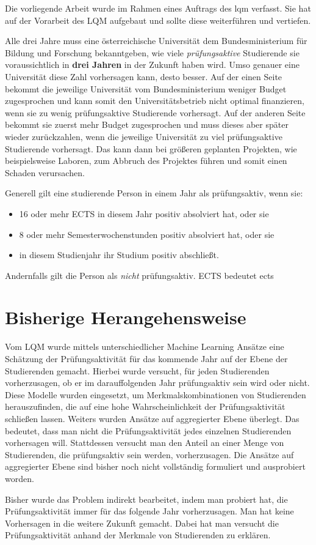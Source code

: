 

Die vorliegende Arbeit wurde im Rahmen eines Auftrags des \gls{lqm} verfasst. Sie hat auf der Vorarbeit des LQM aufgebaut und sollte diese weiterf\"uhren
und vertiefen.

Alle drei Jahre muss eine \"osterreichische Universität dem Bundesministerium f\"ur Bildung und Forschung
bekanntgeben, wie viele \textit{pr\"ufungsaktive} Studierende sie voraussichtlich in \textbf{drei Jahren}
in der Zukunft haben wird. Umso genauer eine Universität diese Zahl vorhersagen kann, desto besser.
Auf der einen Seite bekommt die jeweilige Universität vom Bundesministerium weniger Budget zugesprochen und kann somit 
den Universitätsbetrieb nicht optimal finanzieren, wenn sie zu 
wenig prüfungsaktive Studierende vorhersagt.
Auf der anderen Seite
bekommt sie zuerst mehr Budget zugesprochen und muss dieses aber sp\"ater wieder zur\"uckzahlen,
wenn die jeweilige Universität zu viel pr\"ufungsaktive Studierende vorhersagt. 
Das kann dann bei gr\"o{\ss}eren geplanten Projekten, wie beispielsweise Laboren,
zum Abbruch des Projektes f\"uhren und somit einen Schaden verursachen.

Generell gilt eine studierende Person in einem Jahr als pr\"ufungsaktiv, wenn sie:

\begin{itemize}
    \item 16 oder mehr ECTS in diesem Jahr positiv absolviert hat, oder sie
    \item 8 oder mehr Semesterwochenstunden positiv absolviert hat, oder sie
    \item in diesem Studienjahr ihr Studium positiv abschlie{\ss}t.
\end{itemize}
Andernfalls gilt die Person als \textit{nicht} pr\"ufungsaktiv.
ECTS bedeutet \gls{ects}


\section{Bisherige Herangehensweise}

Vom LQM wurde mittels unterschiedlicher Machine Learning Ans\"atze eine Sch\"atzung der Pr\"ufungsaktivit\"at
f\"ur das kommende Jahr auf der Ebene der Studierenden gemacht. 
Hierbei wurde versucht, f\"ur jeden Studierenden vorherzusagen, ob er im darauffolgenden Jahr pr\"ufungsaktiv sein wird oder nicht.
Diese Modelle wurden eingesetzt, um Merkmalskombinationen von Studierenden herauszufinden,
die auf eine hohe Wahrscheinlichkeit der Pr\"ufungsaktivit\"at schlie{\ss}en lassen.
Weiters wurden Ans\"atze auf aggregierter Ebene \"uberlegt. Das bedeutet, dass man nicht die Pr\"ufungsaktivit\"at jedes
einzelnen Studierenden vorhersagen will. Stattdessen
versucht man den Anteil an einer Menge von Studierenden, die pr\"ufungsaktiv sein werden, vorherzusagen.
Die Ans\"atze auf aggregierter Ebene sind bisher noch nicht vollst\"andig formuliert und ausprobiert worden.


Bisher wurde das Problem indirekt bearbeitet, indem man probiert hat, die Pr\"ufungsaktivit\"at
immer f\"ur das folgende Jahr vorherzusagen. Man hat keine Vorhersagen in die weitere Zukunft gemacht.
Dabei hat man versucht die Pr\"ufungsaktivit\"at anhand der Merkmale von Studierenden zu erkl\"aren.

